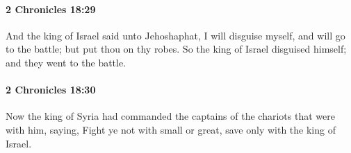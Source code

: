 		\paragraph{2 Chronicles 18:29} %
			\label{2CHRONICLES-18-29}

			And the king of Israel said unto Jehoshaphat, I will disguise myself, and will go to the battle; but put thou on thy robes. So the king of Israel disguised himself; and they went to the battle.


		\paragraph{2 Chronicles 18:30} %
			\label{2CHRONICLES-18-30}

			Now the king of Syria had commanded the captains of the chariots that were with him, saying, Fight ye not with small or great, save only with the king of Israel.

